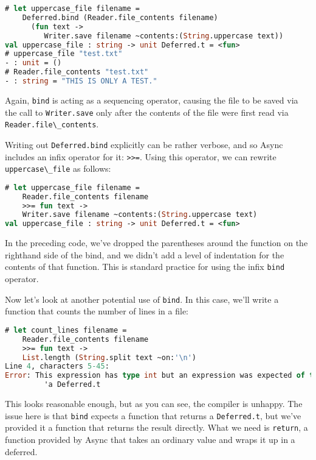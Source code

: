 \begin{lstlisting}[language=Caml]
# let uppercase_file filename =
    Deferred.bind (Reader.file_contents filename)
      (fun text ->
         Writer.save filename ~contents:(String.uppercase text))
val uppercase_file : string -> unit Deferred.t = <fun>
# uppercase_file "test.txt"
- : unit = ()
# Reader.file_contents "test.txt"
- : string = "THIS IS ONLY A TEST."
\end{lstlisting}

Again, \passthrough{\lstinline!bind!} is acting as a sequencing
operator, causing the file to be saved via the call to
\passthrough{\lstinline!Writer.save!} only after the contents of the
file were first read via
\passthrough{\lstinline!Reader.file\_contents!}.

Writing out \passthrough{\lstinline!Deferred.bind!} explicitly can be
rather verbose, and so Async includes an infix operator for it:
\passthrough{\lstinline!>>=!}. Using this operator, we can rewrite
\passthrough{\lstinline!uppercase\_file!} as follows:

\begin{lstlisting}[language=Caml]
# let uppercase_file filename =
    Reader.file_contents filename
    >>= fun text ->
    Writer.save filename ~contents:(String.uppercase text)
val uppercase_file : string -> unit Deferred.t = <fun>
\end{lstlisting}

In the preceding code, we've dropped the parentheses around the function
on the righthand side of the bind, and we didn't add a level of
indentation for the contents of that function. This is standard practice
for using the infix \passthrough{\lstinline!bind!} operator.

Now let's look at another potential use of
\passthrough{\lstinline!bind!}. In this case, we'll write a function
that counts the number of lines in a file:

\begin{lstlisting}[language=Caml]
# let count_lines filename =
    Reader.file_contents filename
    >>= fun text ->
    List.length (String.split text ~on:'\n')
Line 4, characters 5-45:
Error: This expression has type int but an expression was expected of type
         'a Deferred.t
\end{lstlisting}

This looks reasonable enough, but as you can see, the compiler is
unhappy. The issue here is that \passthrough{\lstinline!bind!} expects a
function that returns a \passthrough{\lstinline!Deferred.t!}, but we've
provided it a function that returns the result directly. What we need is
\passthrough{\lstinline!return!}, a function provided by Async that
takes an ordinary value and wraps it up in a deferred.

